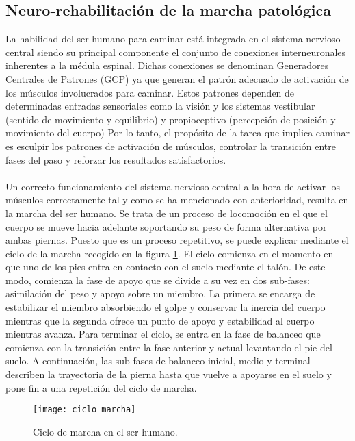 \subsection{Neuro-rehabilitación de la marcha patológica}
La habilidad del ser humano para caminar está integrada en el sistema nervioso central siendo su principal componente el conjunto de conexiones interneuronales inherentes a la médula espinal. Dichas conexiones se denominan Generadores Centrales de Patrones (GCP) ya que generan el patrón adecuado de activación de los músculos involucrados para caminar. Estos patrones dependen de determinadas entradas sensoriales como la visión y los sistemas vestibular (sentido de movimiento y equilibrio) y propioceptivo (percepción de posición y movimiento del cuerpo) Por lo tanto, el propósito de la tarea que implica caminar es esculpir los patrones de activación de músculos, controlar la transición entre fases del paso y reforzar los resultados satisfactorios\cite{rehabilitacion_caminar}.
\\
\\
Un correcto funcionamiento del sistema nervioso central a la hora de activar los músculos correctamente tal y como se ha mencionado con anterioridad, resulta en la marcha del ser humano. Se trata de un proceso de locomoción en el que el cuerpo se mueve hacia adelante soportando su peso de forma alternativa por ambas piernas. Puesto que es un proceso repetitivo, se puede explicar mediante el ciclo de la marcha recogido en la figura \ref{fig:ciclo_marcha}. El ciclo comienza en el momento en que uno de los pies entra en contacto con el suelo mediante el talón. De este modo, comienza la fase de apoyo que se divide a su vez en dos sub-fases: asimilación del peso y apoyo sobre un miembro. La primera se encarga de estabilizar el miembro absorbiendo el golpe y conservar la inercia del cuerpo mientras que la segunda ofrece un punto de apoyo y estabilidad al cuerpo mientras avanza. Para terminar el ciclo, se entra en la fase de balanceo que comienza con la transición entre la fase anterior y actual levantando el pie del suelo. A continuación, las sub-fases de balanceo inicial, medio y terminal describen la trayectoria de la pierna hasta que vuelve a apoyarse en el suelo y pone fin a una repetición del ciclo de marcha\cite{ciclo_marcha}.\\

\begin{figure}[!htb]
\centering
\texttt{[image: ciclo\_marcha]}
  \caption{Ciclo de marcha en el ser humano\cite{ciclo_marcha}.}\label{fig:ciclo_marcha}
\end{figure}

